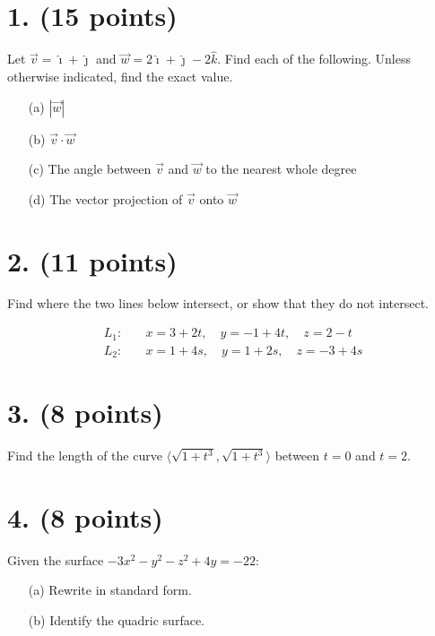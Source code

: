 \section*{1. (15 points)}

Let $\vec{v} = \hat{\imath} + \hat{\jmath}$ and $\vec{w} = 2\hat{\imath} + \hat{\jmath} - 2\hat{k}$. Find each of the following. Unless otherwise indicated, find the exact value.

\begin{itemize}
    \item[(a)] $|\vec{w}|$
    \item[(b)] $\vec{v} \cdot \vec{w}$
    \item[(c)] The angle between $\vec{v}$ and $\vec{w}$ to the nearest whole degree
    \item[(d)] The vector projection of $\vec{v}$ onto $\vec{w}$
\end{itemize}

\newpage

\section*{2. (11 points)}

Find where the two lines below intersect, or show that they do not intersect.

\[
\begin{aligned}
L_1: & \quad x = 3 + 2t, \quad y = -1 + 4t, \quad z = 2 - t \\


L_2: & \quad x = 1 + 4s, \quad y = 1 + 2s, \quad z = -3 + 4s
\end{aligned}
\]

\newpage

\section*{3. (8 points)}

Find the length of the curve $\langle \sqrt{1 + t^3}, \sqrt{1 + t^3} \rangle$ between $t = 0$ and $t = 2$.

\section*{4. (8 points)}

Given the surface $-3x^2 - y^2 - z^2 + 4y = -22$:

\begin{itemize}
    \item[(a)] Rewrite in standard form.
    \item[(b)] Identify the quadric surface.
\end{itemize}

